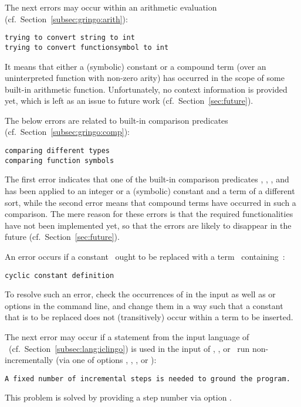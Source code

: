 The next errors may occur within an arithmetic evaluation
(cf.\ Section~\ref{subsec:gringo:arith}):
%
\begin{lstlisting}[numbers=none,escapechar=@]
trying to convert string to int
trying to convert functionsymbol to int
\end{lstlisting}
%
It means that either a (symbolic) constant or a compound term
(over an uninterpreted function with non-zero arity)
has occurred in the scope of some built-in arithmetic function.
Unfortunately, no context information is provided yet,
which is left as an issue to future work
(cf.\ Section~\ref{sec:future}).

The below errors are related to built-in comparison predicates
(cf.\ Section~\ref{subsec:gringo:comp}):
%
\begin{lstlisting}[numbers=none,escapechar=@]
comparing different types
comparing function symbols
\end{lstlisting}
%
The first error indicates that one of the built-in comparison predicates
\code{<}, \code{<=}, \code{>}, and \code{>=}
has been applied to an integer or a (symbolic) constant
and a term of a different sort,
while the second error means that compound terms have occurred in such a comparison.
The mere reason for these errors is that the required functionalities
have not been implemented yet,
so that the errors are likely to disappear in the future
(cf.\ Section~\ref{sec:future}).

An error occurs if a constant~
ought to be replaced with a term~
containing~:
%
\begin{lstlisting}[numbers=none,escapechar=@]
cyclic constant definition
\end{lstlisting}
%
To resolve such an error, check the occurrences of 
in the input as well as  or  options
in the command line, and change them in a way such that a constant
that is to be replaced does not (transitively) occur within a term
to be inserted.

The next error may occur if a statement from the input language
of \iclingo\ (cf.\ Section~\ref{subsec:lang:iclingo})
is used in the input of \gringo, \clingo, or
\iclingo\ run non-incrementally
(via one of options , , ,
 or ):
%
\begin{lstlisting}[numbers=none,escapechar=@]
A fixed number of incremental steps is needed to ground the program.
\end{lstlisting}
%
This problem is solved by providing a step number
via option .

